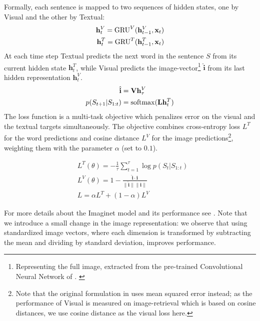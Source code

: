 Formally, each sentence is mapped to two sequences of hidden states, 
one by {\sc Visual} and the other by {\sc Textual}:
\vspace{-.2cm}
\begin{align}
  \mathbf{h}^{V}_t = \mathrm{GRU}^V(\mathbf{h}^{V}_{t-1},\mathbf{x}_t)\\
  \mathbf{h}^{T}_t = \mathrm{GRU}^T(\mathbf{h}^{T}_{t-1},\mathbf{x}_t)
\vspace{-.1cm}
\end{align}
%
At each time step {\sc Textual} predicts the next word in the sentence
$S$ from its current hidden state $\mathbf{h}^{T}_t$, while {\sc
  Visual} predicts the image-vector\footnote{Representing the full image, 
  extracted from the pre-trained Convolutional Neural Network of 
  . \label{edit:dumdumeddy}}
$\hat{\mathbf{i}}$ from its last
hidden representation $\mathbf{h}^{V}_t$.
%
\vspace{-.2cm}
\begin{align}
   \hat{\mathbf{i}} &= \mathbf{V} \mathbf{h}^{V}_\tau \\
    p(S_{t+1}|S_{1:t}) &= \mathrm{softmax}(\mathbf{L}\mathbf{h}^T_t)
\vspace{-.1cm}
\end{align}
%
The loss function is a multi-task objective which penalizes error on
the visual and the textual targets simultaneously. The objective
combines cross-entropy loss $L^{T}$ for the word predictions
and cosine distance $L^V$ for the image
predictions\footnote{Note that the original formulation in
   uses mean squared error instead; as the performance of
{\sc Visual} is measured on image-retrieval which is based on cosine 
distances, we use cosine distance as the visual loss here.\label{ft:imaginet}}, weighting them with the parameter $\alpha$ (set to $0.1$).

\begin{align}
&L^{T}(\theta) = {-} \frac{1}{\tau}\sum_{t=1}^\tau \log p(S_t|S_{1:t}) \\
&L^V(\theta) =  1 - \frac{\hat{\mathbf{i}} \cdot \mathbf{i}}{\| \hat{\mathbf{i}} \| \| \mathbf{i} \|} \\
\label{eq:losscombo}
&L = \alpha L^T + (1-\alpha)L^{V}
\end{align}

\noindent
For more details about the {\sc Imaginet} model and its performance
see . Note that we introduce a small change in
the image representation: we observe that using standardized image
vectors, where each dimension is transformed by subtracting the mean
and dividing by standard deviation, improves performance.





